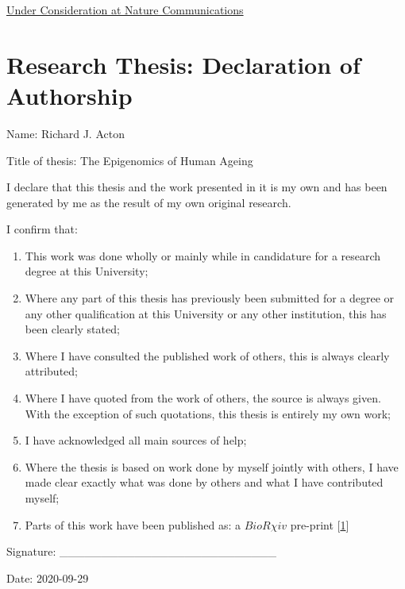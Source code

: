 \documentclass[
]{book}
\providecommand{\tightlist}{%
  \setlength{\itemsep}{0pt}\setlength{\parskip}{0pt}}
\begin{document}
\href{https://nature-research-under-consideration.nature.com/users/37265-nature-communications/posts/57741-the-genomic-loci-of-specific-human-trna-genes-exhibit-ageing-related-dna-hypermethylation}{Under Consideration at Nature Communications}

\hypertarget{research-thesis-declaration-of-authorship}{%
\section*{Research Thesis: Declaration of Authorship}\label{research-thesis-declaration-of-authorship}}

Name: Richard J. Acton

Title of thesis: The Epigenomics of Human Ageing

I declare that this thesis and the work presented in it is my own and has been generated by me as the result of my own original research.

I confirm that:

\begin{enumerate}
\def\labelenumi{\arabic{enumi}.}
\tightlist
\item
  This work was done wholly or mainly while in candidature for a research degree at this University;
\item
  Where any part of this thesis has previously been submitted for a degree or any other qualification at this University or any other institution, this has been clearly stated;
\item
  Where I have consulted the published work of others, this is always clearly attributed;
\item
  Where I have quoted from the work of others, the source is always given. With the exception of such quotations, this thesis is entirely my own work;
\item
  I have acknowledged all main sources of help;
\item
  Where the thesis is based on work done by myself jointly with others, I have made clear exactly what was done by others and what I have contributed myself;
\item
  Parts of this work have been published as: a \(BioR \chi iv\) pre-print {[}\protect\hyperlink{ref-Acton2020}{1}{]}
\end{enumerate}

Signature: \_\_\_\_\_\_\_\_\_\_\_\_\_\_\_\_\_\_\_\_\_\_\_\_\_\_

Date: 2020-09-29
\end{document}
